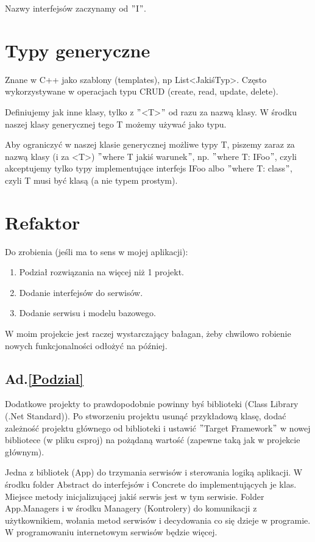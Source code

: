 \documentclass[10pt]{article}
\begin{document}
Nazwy interfejsów zaczynamy od $"$I$"$.

\section{Typy generyczne}
Znane w C++ jako szablony (templates), np List<JakiśTyp>. Często wykorzystywane w operacjach typu CRUD (create, read, update, delete).

Definiujemy jak inne klasy, tylko z $"$<T>$"$ od razu za nazwą klasy. W środku naszej klasy generycznej tego T możemy używać jako typu.

Aby ograniczyć w naszej klasie generycznej możliwe typy T, piszemy zaraz za nazwą klasy (i za <T>) $"$where T jakiś warunek$"$, np. $"$where T: IFoo$"$, czyli akceptujemy tylko typy implementujące interfejs IFoo albo $"$where T: class$"$, czyli T musi być klasą (a nie typem prostym).

\section{Refaktor}
Do zrobienia (jeśli ma to sens w mojej aplikacji):
\begin{enumerate}
\item \label{Podzial} Podział rozwiązania na więcej niż 1 projekt.
\item \label{Interfejsy} Dodanie interfejsów do serwisów.
\item \label{Elementy Bazowe} Dodanie serwisu i modelu bazowego.
\end{enumerate}

W moim projekcie jest raczej wystarczający bałagan, żeby chwilowo robienie nowych funkcjonalności odłożyć na później.

\subsection{Ad.\ref{Podzial}}
Dodatkowe projekty to prawdopodobnie powinny byś biblioteki (Class Library (.Net Standard)). Po stworzeniu projektu usunąć przykładową klasę, dodać zależność projektu głównego od biblioteki i ustawić $"$Target Framework$"$ w nowej bibliotece (w pliku csproj) na pożądaną wartość (zapewne taką jak w projekcie głównym).

Jedna z bibliotek (App) do trzymania serwisów i sterowania logiką aplikacji. W środku folder Abstract do interfejsów i Concrete do implementujących je klas. Miejsce metody inicjalizującej jakiś serwis jest w tym serwisie. Folder App.Managers i w środku Managery (Kontrolery) do komunikacji z użytkownikiem, wołania metod serwisów i decydowania co się dzieje w programie. W programowaniu internetowym serwisów będzie więcej.
\end{document}
